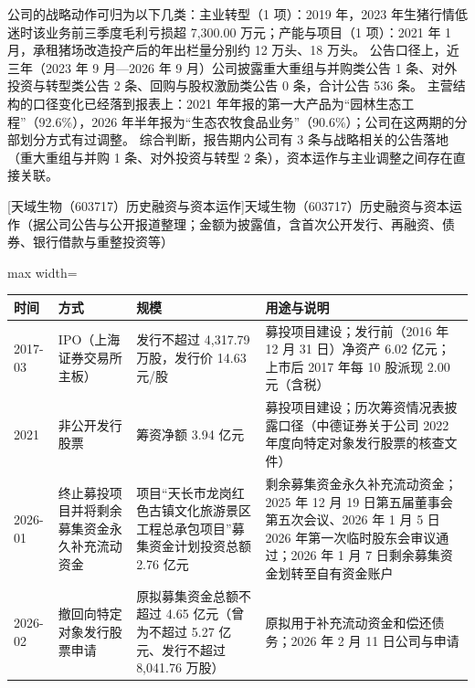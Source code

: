  公司的战略动作可归为以下几类：主业转型（1 项）：2019 年，2023 年生猪行情低迷时该业务前三季度毛利亏损超 7,300.00 万元；产能与项目（1 项）：2021 年 1 月，承租猪场改造投产后的年出栏量分别约 12 万头、18 万头。 公告口径上，近三年（2023 年 9 月---2026 年 9 月）公司披露重大重组与并购类公告 1 条、对外投资与转型类公告 2 条、回购与股权激励类公告 0 条，合计公告 536 条。 主营结构的口径变化已经落到报表上：2021 年年报的第一大产品为“园林生态工程”（92.6\%），2026 年半年报为“生态农牧食品业务”（90.6\%）；公司在这两期的分部划分方式有过调整。 综合判断，报告期内公司有 3 条与战略相关的公告落地（重大重组与并购 1 条、对外投资与转型 2 条），资本运作与主业调整之间存在直接关联。

\begin{center}\small\setlength{\tabcolsep}{4pt}
[天域生物（603717）历史融资与资本运作]{天域生物（603717）历史融资与资本运作（据公司公告与公开报道整理；金额为披露值，含首次公开发行、再融资、债券、银行借款与重整投资等）}
\begin{adjustbox}{max width=\textwidth}
\begin{tabular}{@{}p{1.45cm}p{2.55cm}p{4.05cm}p{4.95cm}@{}}
\toprule
时间 & 方式 & 规模 & 用途与说明 \\
\midrule
2017-03 & IPO（上海证券交易所主板） & 发行不超过 4,\allowbreak{}317.79 万股，\allowbreak{}发行价 14.63 元/\allowbreak{}股 & 募投项目建设；发行前（2016 年 12 月 31 日）净资产 6.02 亿元；上市后 2017 年每 10 股派现 2.00 元（含税） \\
2021 & 非公开发行股票 & 筹资净额 3.94 亿元 & 募投项目建设；历次筹资情况表披露口径（中德证券关于公司 2022 年度向特定对象发行股票的核查文件） \\
2026-01 & 终止募投项目并将剩余募集资金永久补充流动资金 & 项目“天长市龙岗红色古镇文化旅游景区工程总承包项目”募集资金计划投资总额 2.76 亿元 & 剩余募集资金永久补充流动资金；2025 年 12 月 19 日第五届董事会第五次会议、\allowbreak{}2026 年 1 月 5 日 2026 年第一次临时股东会审议通过；2026 年 1 月 7 日剩余募集资金划转至自有资金账户 \\
2026-02 & 撤回向特定对象发行股票申请 & 原拟募集资金总额不超过 4.65 亿元（曾为不超过 5.27 亿元、\allowbreak{}发行不超过 8,\allowbreak{}041.76 万股） & 原拟用于补充流动资金和偿还债务；2026 年 2 月 11 日公司与申请 \\
\bottomrule
\end{tabular}
\end{adjustbox}
\end{center}


